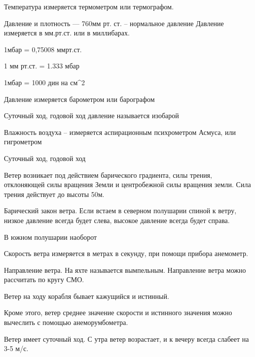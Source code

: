 \documentclass{article}        %
\begin{document}
Температура измеряется термометром или термографом.

Давление и плотность --- 760мм рт. ст. -- нормальное давление
Давление измеряется в мм.рт.ст. или в миллибарах.

1мбар = 0,75008 ммрт.ст.

1 мм рт.ст. = 1.333 мбар

1мбар = 1000 дин на см^2

Давление измеряется барометром или барографом

Суточный ход, годовой ход давление называется изобарой


Влажность воздуха -- измеряется аспирационным психрометром Асмуса, или гигрометром

Суточный ход, годовой ход

Ветер возникает под действием барического градиента, силы трения, отклоняющей силы вращения 
Земли и центробежной силы вращения земли. Сила трения действует до высоты 50м.

Барический закон ветра. Если встаем в северном полушарии спиной к ветру, 
низкое давление всегда будет слева, высокое давление всегда будет справа.

В южном полушарии наоборот


Скорость ветра измеряется в метрах в секунду, при помощи прибора анемометр.

Направление ветра. На яхте называется вымпельным. Направление ветра можно рассчитать по кругу СМО. 

Ветер на ходу корабля бывает кажущийся и истинный.

Кроме этого, ветер среднее значение скорости и истинного значения можно вычеслить с помощью анеморумбометра.

Ветер имеет суточный ход. С утра ветер возрастает, и к вечеру всегда слабеет на 3-5 м/с.
\end{document}
